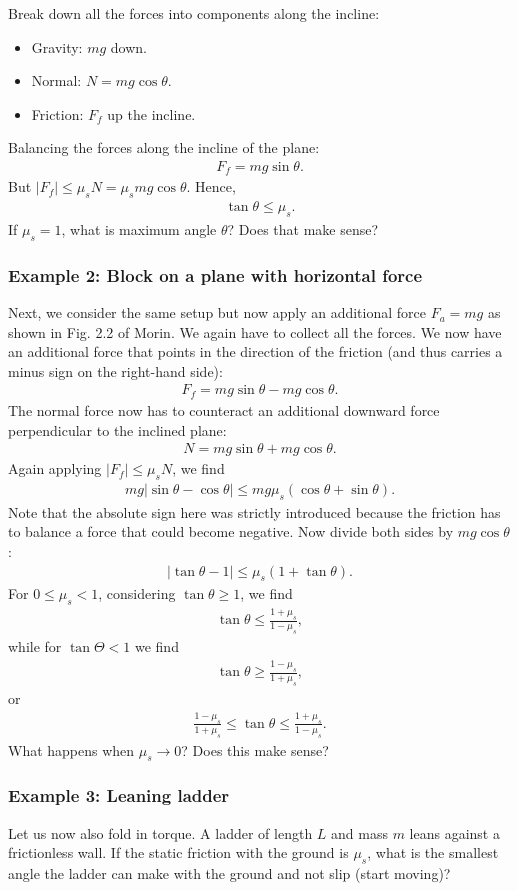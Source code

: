 \documentclass[12pt]{article}
\newcommand{\be}{\begin{eqnarray}}
\newcommand{\ee}{\end{eqnarray}}
\begin{document}
Break down all the forces into components along the incline:
\begin{itemize}
  \item Gravity: $mg$ down.
  \item Normal: $N = mg \cos\theta$.
  \item Friction: $F_f$ up the incline.
\end{itemize}

Balancing the forces  along the incline of the plane:
\be
 F_f = mg \sin\theta.
\ee
But $|F_f| \leq \mu_s N = \mu_s mg \cos\theta$. Hence,
\be 
\tan\theta \leq \mu_s.
\ee
If $\mu_s = 1$, what is maximum angle $\theta$? Does that make sense?

\subsubsection*{Example 2: Block on a plane with horizontal force}

Next, we consider the same setup but now apply an additional force $F_a = mg$ as shown in Fig. 2.2 of Morin. We again have to collect all the forces. We now have an additional force that points in the direction of the friction (and thus carries a minus sign on the right-hand side): 
\be
F_f = mg \sin\theta - mg \cos \theta.
\ee
The normal force now has to counteract an additional downward force perpendicular to the inclined plane:
\be
N = mg \sin\theta + mg \cos \theta.
\ee
Again applying $|F_f| \leq \mu_s N$, we find 
\be
mg |\sin \theta - \cos\theta| \leq mg \mu_s (\cos \theta + \sin \theta).
\ee
Note that the absolute sign here was strictly introduced because the friction has to balance a force that could become negative. Now divide both sides by $mg\cos \theta$: 
\be
|\tan \theta - 1| \leq\mu_s (1 + \tan \theta).
\ee
For $0\leq\mu_s<1$, considering $\tan \theta \geq 1$, we find
\be
\tan \theta \leq \frac{1+\mu_s}{1-\mu_s},
\ee
while for $\tan \Theta < 1$ we find 
\be
\tan \theta \geq \frac{1-\mu_s}{1+\mu_s},
\ee
or 
\be
\frac{1-\mu_s}{1+\mu_s}\leq \tan \theta \leq \frac{1+\mu_s}{1-\mu_s}. 
\ee
What happens when $\mu_s \rightarrow 0$? Does this make sense?

\subsubsection*{Example 3: Leaning ladder}
Let us now also fold in torque. A ladder of length $L$ and mass $m$ leans against a frictionless wall. If the static friction with the ground is $\mu_s$, what is the smallest angle the ladder can make with the ground and not slip (start moving)?
\end{document}
